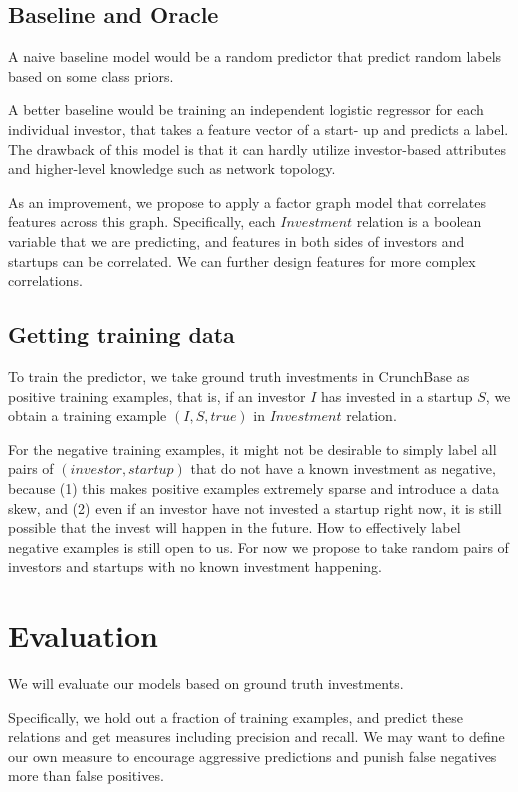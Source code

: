 \subsection{Baseline and Oracle}\label{baseline-and-oracle}

A naive baseline model would be a random predictor that predict random
labels based on some class priors.

A better baseline would be training an independent logistic regressor
for each individual investor, that takes a feature vector of a start- up
and predicts a label. The drawback of this model is that it can hardly
utilize investor-based attributes and higher-level knowledge such as
network topology.

As an improvement, we propose to apply a factor graph model that
correlates features across this graph. Specifically, each \(Investment\)
relation is a boolean variable that we are predicting, and features in
both sides of investors and startups can be correlated. We can further
design features for more complex correlations.

\subsection{Getting training data}\label{getting-training-data}

To train the predictor, we take ground truth investments in CrunchBase
as positive training examples, that is, if an investor \(I\) has
invested in a startup \(S\), we obtain a training example
\((I, S, true)\) in \(Investment\) relation.

For the negative training examples, it might not be desirable to simply
label all pairs of \((investor, startup)\) that do not have a known
investment as negative, because (1) this makes positive examples
extremely sparse and introduce a data skew, and (2) even if an investor
have not invested a startup right now, it is still possible that the
invest will happen in the future. How to effectively label negative
examples is still open to us. For now we propose to take random pairs of
investors and startups with no known investment happening.

\section{Evaluation}\label{evaluation}

We will evaluate our models based on ground truth investments.

Specifically, we hold out a fraction of training examples, and predict
these relations and get measures including precision and recall. We may
want to define our own measure to encourage aggressive predictions and
punish false negatives more than false positives.


